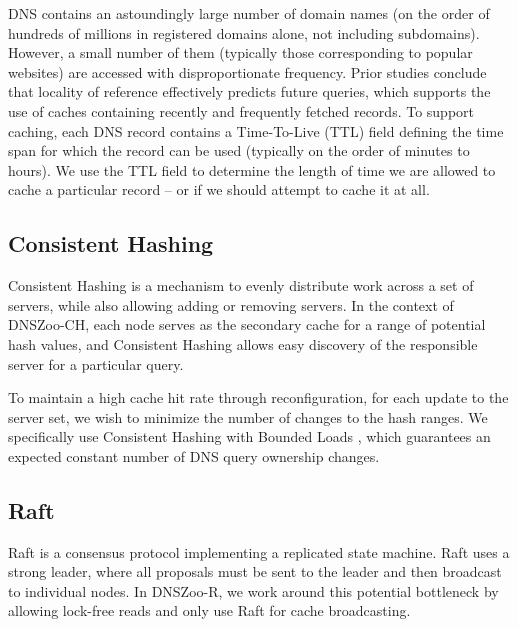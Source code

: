 \documentclass[format=sigconf,nonacm,screen]{acmart}
\newcommand{\dnszooch}{\textsf{DNSZoo-CH}}
\newcommand{\dnszoor}{\textsf{DNSZoo-R}}
\begin{document}
DNS contains an astoundingly large number of domain names (on the order of hundreds of millions in registered domains alone, not including subdomains). However, a small number of them (typically those corresponding to popular websites) are accessed with disproportionate frequency. Prior studies \cite{1992dnscaching,2002dnscaching} conclude that locality of reference effectively predicts future queries, which supports the use of caches containing recently and frequently fetched records. To support caching, each DNS record contains a Time-To-Live (TTL) field defining the time span for which the record can be used (typically on the order of minutes to hours). We use the TTL field to determine the length of time we are allowed to cache a particular record -- or if we should attempt to cache it at all.

\subsection{Consistent Hashing}

Consistent Hashing \cite{1997consistenthashing,2001chord} is a mechanism to evenly distribute work across a set of servers, while also allowing adding or removing servers. In the context of \dnszooch{}, each node serves as the secondary cache for a range of potential hash values, and Consistent Hashing allows easy discovery of the responsible server for a particular query.

To maintain a high cache hit rate through reconfiguration, for each update to the server set, we wish to minimize the number of changes to the hash ranges. We specifically use Consistent Hashing with Bounded Loads \cite{2016chbl}, which guarantees an expected constant number of DNS query ownership changes.

\subsection{Raft}

Raft \cite{2014raft} is a consensus protocol implementing a replicated state machine. Raft uses a strong leader, where all proposals must be sent to the leader and then broadcast to individual nodes. In \dnszoor{}, we work around this potential bottleneck by allowing lock-free reads and only use Raft for cache broadcasting.
\end{document}
